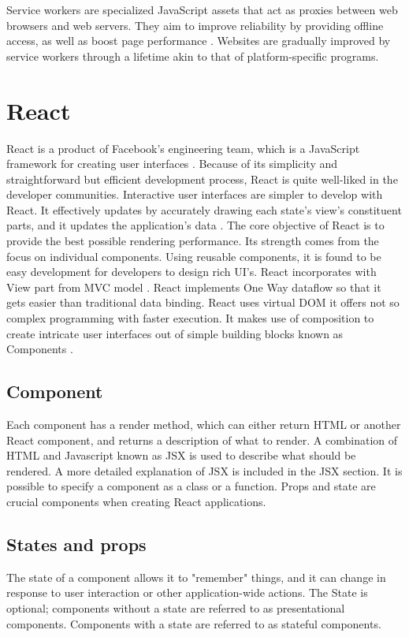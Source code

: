 Service workers are specialized JavaScript assets that act as proxies between web browsers and web servers. They aim to improve reliability by providing offline access, as well as boost page performance \autocite{chrome2021service}. Websites are gradually improved by service workers through a lifetime akin to that of platform-specific programs.


\section{React}
\label{react}
React is a product of Facebook's engineering team, which is a JavaScript framework for creating user interfaces \autocite{gackenheimer2015introducing}. Because of its simplicity and straightforward but efficient development process, React is quite well-liked in the developer communities. Interactive user interfaces are simpler to develop with React. It effectively updates by accurately drawing each state's view's constituent parts, and it updates the application's data \autocite{islam2017reactjs}. The core objective of React is to provide the best possible rendering performance. Its strength comes from the focus on individual components. Using reusable components, it is found to be easy development for developers to design rich UI's. React incorporates with View part from MVC model \autocite{maratkar2021re}. React implements One Way dataflow so that it gets easier than traditional data binding. React uses virtual DOM it offers not so complex programming with faster execution. It makes use of composition to create intricate user interfaces out of simple building blocks known as Components \autocite{david2020building}.

\subsection{Component}
Each component has a render method, which can either return HTML or another React component, and returns a description of what to render. A combination of HTML and Javascript known as JSX is used to describe what should be rendered. A more detailed explanation of JSX is included in the JSX section. It is possible to specify a component as a class or a function. Props and state are crucial components when creating React applications.

\subsection{States and props}
The state of a component allows it to "remember" things, and it can change in response to user interaction or other application-wide actions. The State is optional; components without a state are referred to as presentational components. Components with a state are referred to as stateful components.

